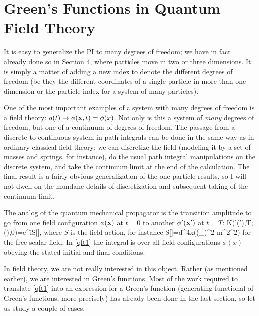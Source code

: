 \documentclass[12pt]{article}
\begin{document}
\section[Perturbation Theory II]
{Green's Functions in Quantum Field Theory}

It is easy to generalize the PI to many degrees of freedom; we have in
fact already done so in Section 4, where particles move in two or
three dimensions. It is simply a matter of adding a new index to
denote the different degrees of freedom (be they the different
coordinates of a single particle in more than one dimension or the
particle index for a system of many particles).

One of the most important examples of a system
with many degrees of freedom is a field
theory: $q(t)\to\phi({\mathbf x},t)=\phi(x)$. Not only is this a system of
{\em many} degrees of freedom, but one of a continuum of degrees of
freedom. The passage from a discrete to continuous system in path
integrals can be done in the same way as in ordinary classical
field theory: we
can discretize the field (modeling it by a set of masses and springs,
for instance), do the usual path integral manipulations on the
discrete system, and take the continuum limit at the end of the
calculation. The final result is a fairly obvious generalization of
the one-particle results, so I will not dwell on the mundane details
of discretization and subsequent taking of the continuum limit.

The analog of the quantum mechanical propagator is the transition
amplitude to go from one field configuration $\phi({\mathbf x})$ at $t=0$ to
another $\phi'({\mathbf x}')$ at $t=T$:
\beq
K(\phi'(\bfx'),T;\phi(\bfx),0)=\int \DD\phi e^{iS[\phi]},
\label{qft1}
\eeq
where $S$ is the field action, for instance
\beq
S[\phi]=\int d^4x\left(\half(\partial_\mu\phi)^2-\half m^2\phi^2\right)
\label{fsf}
\eeq
for the
free scalar field. In \eqref{qft1}
the integral is over all field configurations $\phi(x)$ obeying the
stated initial and final conditions.

In field theory, we are not really interested in this object. Rather
(as mentioned earlier), we are interested in Green's functions. Most of
the work required to translate \eqref{qft1} into an expression for a
Green's function (generating functional of Green's functions,
more precisely) has already been done in the last section, so let us
study a couple of cases.
\end{document}
